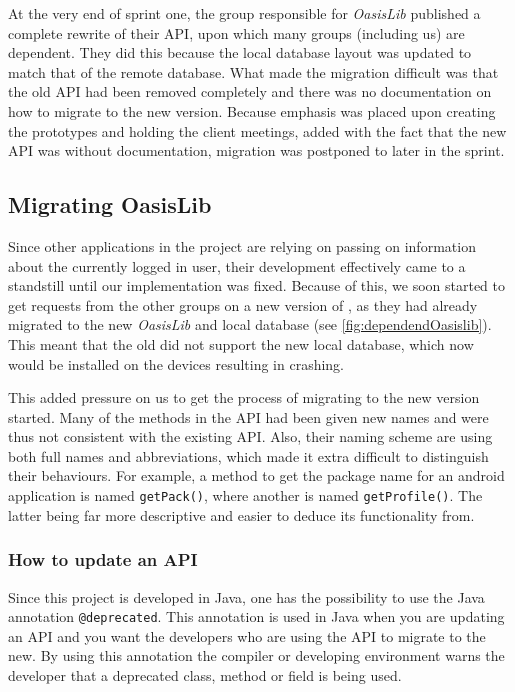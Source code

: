 At the very end of sprint one, the group responsible for \textit{OasisLib} published a complete rewrite of their API,  upon which many groups (including us) are dependent.
They did this because the local database layout was updated to match that of the remote database.
What made the migration difficult was that the old API had been removed completely and there was no documentation on how to migrate to the new version.
Because emphasis was placed upon creating the prototypes and holding the client meetings, added with the fact that the new API was without documentation, migration was postponed to later in the sprint.

\subsection{Migrating OasisLib}\label{sec:oasismigration}

Since other applications in the \giraf project are relying on \launcher passing on information about the currently logged in user, their development effectively came to a standstill until our implementation was fixed.
Because of this, we soon started to get requests from the other groups on a new version of \launcher, as they had already migrated to the new \textit{OasisLib} and local database (see \cref{fig:dependendOasislib}).
This meant that the old \launcher did not support the new local database, which now would be installed on the devices resulting in \launcher crashing.


This added pressure on us to get the process of migrating to the new version started.
Many of the methods in the API had been given new names and were thus not consistent with the existing API.
Also, their naming scheme are using both full names and abbreviations, which made it extra difficult to distinguish their behaviours.
For example, a method to get the package name for an android application is named \lstinline{getPack()}, where another is named \lstinline{getProfile()}.
The latter being far more descriptive and easier to deduce its functionality from.

\subsubsection{How to update an API}
Since this project is developed in Java, one has the possibility to use the Java annotation \lstinline{@deprecated}.
This annotation is used in Java when you are updating an API and you want the developers who are using the API to migrate to the new.
By using this annotation the compiler or developing environment warns the developer that a deprecated class, method or field is being used.

